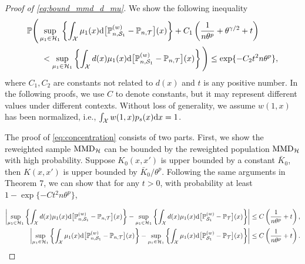 \documentclass[12pt]{article}
\newcommand{\prob}{\mathbb{P}}
\begin{document}
\begin{proof}[Proof of \eqref{eq:bound_mmd_d_mu}]
	We show the following inequality
	\begin{equation}
		\label{eq:concentration}
		\begin{aligned}
			\prob \Bigg(
			&
			\sup_{\mu_1 \in \mathcal{H}_1}
			\left\{ \int_\mathcal{X} \mu_1(x) \textnormal{d} \big[\prob_{n,\mathcal{S}_1}^{(w)} - \prob_{n,\mathcal{T}}\big](x) \right\} + 
			C_1 \left( \frac{1}{n \theta^p} + \theta^{\gamma/2} + t \right)
			\\&~<
			\sup_{\mu_1 \in \mathcal{H}_1}
			\left\{ \int_\mathcal{X} d(x) \mu_1(x) \textnormal{d} \big[\prob_{n,\mathcal{S}_1}^{(w)} - \prob_{n,\mathcal{T}}\big](x) \right\}
			\Bigg) \le \exp\{-C_2 t^2 n \theta^p\}
			,\end{aligned}
	\end{equation}
	where $C_1, C_2$ are constants not related to $d(x)$ and $t$ is any positive number.
	In the following proofs, we use $C$ to denote constants, but it may represent different values under different contexts. Without loss of generality, we assume $w(1, x)$ has been normalized, i.e., $\int_\mathcal{X} w(1, x) p_s(x) \textnormal{d} x = 1$.
	
	The proof of \eqref{eq:concentration} consists of two parts. First, we show the reweighted sample $\textnormal{MMD}_\mathcal{H}$ can be bounded by the reweighted population $\textnormal{MMD}_\mathcal{H}$ with high probability. Suppose $K_0(x, x')$ is upper bounded by a constant $\bar{K}_0$, then $K(x, x')$ is upper bounded by $\bar{K}_0 / \theta^p$. Following the same arguments in \citet{gretton2012kernel} Theorem 7, we can show that for any $t > 0$, with probability at least $1 - \exp\{-C t^2 n \theta^p\}$,
	
	{\small
		\begin{equation}
			\label{eq:mmd_du_u_sample_pop}
			\begin{aligned}
				\left| 
				\sup_{\mu_1 \in \mathcal{H}_1}
				\left\{ \int_\mathcal{X} d(x) \mu_1(x) \textnormal{d} \big[\prob_{n,\mathcal{S}_1}^{(w)} - \prob_{n,\mathcal{T}}\big](x) \right\}
				-
				\sup_{\mu_1 \in \mathcal{H}_1}
				\left\{ \int_\mathcal{X} d(x) \mu_1(x) \textnormal{d} \big[\prob_{\mathcal{S}_1}^{(w)} - \prob_{\mathcal{T}}\big](x) \right\}
				\right|
				&\le
				C\left( \frac{1}{{n \theta^p}} + t \right),
				\\
				\left| 
				\sup_{\mu_1 \in \mathcal{H}_1}
				\left\{ \int_\mathcal{X} \mu_1(x) \textnormal{d} \big[\prob_{n,\mathcal{S}_1}^{(w)} - \prob_{n,\mathcal{T}}\big](x) \right\}
				-
				\sup_{\mu_1 \in \mathcal{H}_1}
				\left\{ \int_\mathcal{X} \mu_1(x) \textnormal{d} \big[\prob_{\mathcal{S}_1}^{(w)} - \prob_{\mathcal{T}}\big](x) \right\}
				\right|
				&\le
				C\left( \frac{1}{{n \theta^p}} + t \right)
				.\end{aligned}
		\end{equation}
	}
	

\end{proof}
\end{document}
